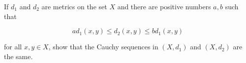 If $d_1$ and $d_2$ are metrics on the set $X$ and there are positive numbers $a,b$ such that

$$ad_1(x,y)\leq d_2(x,y)\leq bd_1(x,y)$$

for all $x,y\in X$, show that the Cauchy sequences in $(X,d_1)$ and $(X,d_2)$ are the same.\\
